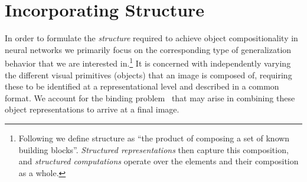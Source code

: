 \documentclass{article}
\begin{document}
\section{Incorporating Structure}
In order to formulate the \emph{structure} required to achieve object compositionality in neural networks we primarily focus on the corresponding type of generalization behavior that we are interested in.\footnote{Following \cite{battaglia2018relational} we define structure as ``the product of composing a set of known building blocks''. \emph{Structured representations} then capture this composition, and \emph{structured computations} operate over the elements and their composition as a whole.}
It is concerned with independently varying the different visual primitives (objects) that an image is composed of, requiring these to be identified at a representational level and described in a common format. %
We account for the binding problem~\citep{hinton1984distributed, milner1974model, von1994correlation} that may arise in combining these object representations to arrive at a final image.
\end{document}
